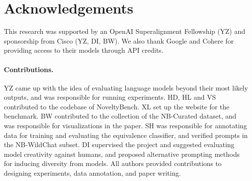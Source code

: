 
\section{Acknowledgements}
\label{sec-ack}
This research was supported by an OpenAI Superalignment Fellowship (YZ) and sponsorship from Cisco (YZ, DI, BW).
We also thank Google and Cohere for providing access to their models through API credits.

\paragraph{Contributions.}
YZ came up with the idea of evaluating language models beyond their most likely outputs, and was responsible for running experiments.
HD, HL and VS contributed to the codebase of NoveltyBench.
XL set up the website for the benchmark.
BW contributed to the collection of the NB-Curated dataset, and was responsible for visualizations in the paper.
SH was responsible for annotating data for training and evaluating the equivalence classifier, and verified prompts in the NB-WildChat subset.
DI supervised the project and suggested evaluating model creativity against humans, and proposed alternative prompting methods for inducing diversity from models.
All authors provided contributions to designing experiments, data annotation, and paper writing.
